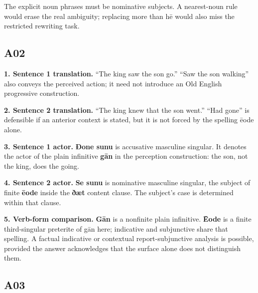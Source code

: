 The explicit noun phrases must be nominative subjects. A nearest-noun rule would erase the real ambiguity; replacing more than hē would also miss the restricted rewriting task.

\subsection*{A02}

\textbf{1. Sentence 1 translation.} “The king saw the son go.” “Saw the son walking” also conveys the perceived action; it need not introduce an Old English progressive construction.

\textbf{2. Sentence 2 translation.} “The king knew that the son went.” “Had gone” is defensible if an anterior context is stated, but it is not forced by the spelling ēode alone.

\textbf{3. Sentence 1 actor.} \textbf{Ðone sunu} is accusative masculine singular. It denotes the actor of the plain infinitive \textbf{gān} in the perception construction: the son, not the king, does the going.

\textbf{4. Sentence 2 actor.} \textbf{Se sunu} is nominative masculine singular, the subject of finite \textbf{ēode} inside the \textbf{ðæt} content clause. The subject’s case is determined within that clause.

\textbf{5. Verb-form comparison.} \textbf{Gān} is a nonfinite plain infinitive. \textbf{Ēode} is a finite third-singular preterite of gān here; indicative and subjunctive share that spelling. A factual indicative or contextual report-subjunctive analysis is possible, provided the answer acknowledges that the surface alone does not distinguish them.

\subsection*{A03}

